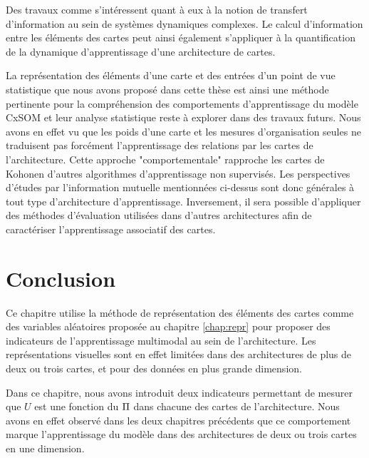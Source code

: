 \documentclass[../main]{subfiles}
\begin{document}
Des travaux comme \cite{lizier_detecting_2007,ceguerra_information_2011} s'intéressent quant à eux à la notion de transfert d'information au sein de systèmes dynamiques complexes. Le calcul d'information entre les éléments des cartes peut ainsi également s'appliquer à la quantification de la dynamique d'apprentissage d'une architecture de cartes.

La représentation des éléments d'une carte et des entrées d'un point de vue statistique que nous avons proposé dans cette thèse est ainsi une méthode pertinente pour la compréhension des comportements d'apprentissage du modèle CxSOM et leur analyse statistique reste à explorer dans des travaux futurs.
Nous avons en effet vu que les poids d'une carte et les mesures d'organisation seules ne traduisent pas forcément l'apprentissage des relations par les cartes de l'architecture. 
Cette approche "comportementale" rapproche les cartes de Kohonen d'autres algorithmes d'apprentissage non supervisés. Les perspectives d'études par l'information mutuelle mentionnées ci-dessus sont donc générales à tout type d'architecture d'apprentissage. Inversement, il sera possible d'appliquer des méthodes d'évaluation utilisées dans d'autres architectures afin de caractériser l'apprentissage associatif des cartes.


\section{Conclusion}

Ce chapitre utilise la méthode de représentation des éléments des cartes comme des variables aléatoires proposée au chapitre \ref{chap:repr} pour proposer des indicateurs de l'apprentissage multimodal au sein de l'architecture.
Les représentations visuelles sont en effet limitées dans des architectures de plus de deux ou trois cartes, et pour des données en plus grande dimension.

Dans ce chapitre, nous avons introduit deux indicateurs permettant de mesurer que $U$ est une fonction du $\Pi$ dans chacune des cartes de l'architecture. 
Nous avons en effet observé dans les deux chapitres précédents que ce comportement marque l'apprentissage du modèle dans des architectures de deux ou trois cartes en une dimension.
\end{document}
